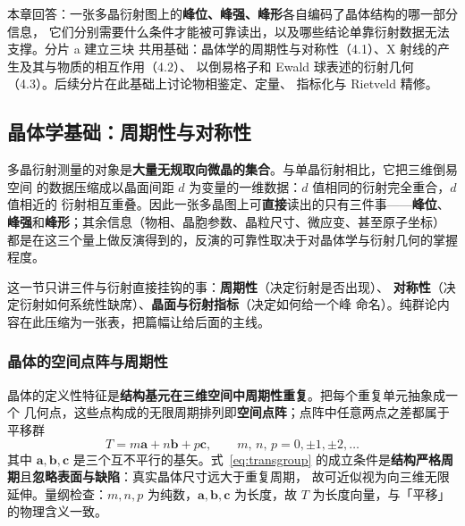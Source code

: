 
%
{本章回答：一张多晶衍射图上的\textbf{峰位、峰强、峰形}各自编码了晶体结构的哪一部分信息，
它们分别需要什么条件才能被可靠读出，以及哪些结论单靠衍射数据无法支撑。分片 a 建立三块
共用基础：晶体学的周期性与对称性（4.1）、X 射线的产生及其与物质的相互作用（4.2）、
以倒易格子和 Ewald 球表述的衍射几何（4.3）。后续分片在此基础上讨论物相鉴定、定量、
指标化与 Rietveld 精修。}
\label{ch:04}

\subsection{晶体学基础：周期性与对称性}

\begin{probout}
多晶衍射测量的对象是\textbf{大量无规取向微晶的集合}。与单晶衍射相比，它把三维倒易空间
的数据压缩成以晶面间距 $d$ 为变量的一维数据：$d$ 值相同的衍射完全重合，$d$ 值相近的
衍射相互重叠。因此一张多晶图上可\textbf{直接}读出的只有三件事——\textbf{峰位}、
\textbf{峰强}和\textbf{峰形}；其余信息（物相、晶胞参数、晶粒尺寸、微应变、甚至原子坐标）
都是在这三个量上做反演得到的，反演的可靠性取决于对晶体学与衍射几何的掌握程度。
\end{probout}

这一节只讲三件与衍射直接挂钩的事：\textbf{周期性}（决定衍射是否出现）、
\textbf{对称性}（决定衍射如何系统性缺席）、\textbf{晶面与衍射指标}（决定如何给一个峰
命名）。纯群论内容在此压缩为一张表，把篇幅让给后面的主线。

\subsubsection{晶体的空间点阵与周期性}

晶体的定义性特征是\textbf{结构基元在三维空间中周期性重复}。把每个重复单元抽象成一个
几何点，这些点构成的无限周期排列即\textbf{空间点阵}；点阵中任意两点之差都属于平移群
\begin{equation}
T=m\boldsymbol{a}+n\boldsymbol{b}+p\boldsymbol{c},
\qquad m,\,n,\,p=0,\pm1,\pm2,\dots
\label{eq:transgroup}
\end{equation}
其中 $\boldsymbol{a},\boldsymbol{b},\boldsymbol{c}$ 是三个互不平行的基矢。式~\eqref{eq:transgroup}
的成立条件是\textbf{结构严格周期}且\textbf{忽略表面与缺陷}：真实晶体尺寸远大于重复周期，
故可近似视为向三维无限延伸。量纲检查：$m,n,p$ 为纯数，$\boldsymbol{a},\boldsymbol{b},
\boldsymbol{c}$ 为长度，故 $T$ 为长度向量，与「平移」的物理含义一致。

